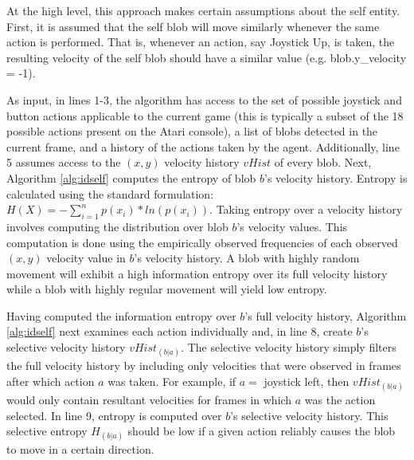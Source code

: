 \documentclass{sig-alternate}
\begin{document}
At the high level, this approach makes certain assumptions about the self entity. First, it is assumed that the self blob will move similarly whenever the same action is performed. That is, whenever an action, say Joystick Up, is taken, the resulting velocity of the self blob should have a similar value (e.g. blob.y\_velocity = -1). 

As input, in lines 1-3, the algorithm has access to the set of possible joystick and button actions applicable to the current game (this is typically a subset of the 18 possible actions present on the Atari console), a list of blobs detected in the current frame, and a history of the actions taken by the agent. Additionally, line 5 assumes access to the $(x,y)$ velocity history $vHist$ of every blob. Next, Algorithm \ref{alg:idself} computes the entropy of blob $b$'s velocity history. Entropy is calculated using the standard formulation: $H(X) = -\sum_{i=1}^n{p(x_i)*ln(p(x_i))}$. Taking entropy over a velocity history involves computing the distribution over blob $b$'s velocity values. This computation is done using the empirically observed frequencies of each observed $(x,y)$ velocity value in $b$'s velocity history. A blob with highly random movement will exhibit a high information entropy over its full velocity history while a blob with highly regular movement will yield low entropy.

Having computed the information entropy over $b$'s full velocity history, Algorithm \ref{alg:idself} next examines each action individually and, in line 8, create $b$'s selective velocity history $vHist_{(b|a)}$. The selective velocity history simply filters the full velocity history by including only velocities that were observed in frames after which action $a$ was taken. For example, if $a = $ joystick left, then $vHist_{(b|a)}$ would only contain resultant velocities for frames in which $a$ was the action selected. In line 9, entropy is computed over $b$'s selective velocity history. This selective entropy $H_{(b|a)}$ should be low if a given action reliably causes the blob to move in a certain direction.
\end{document}
